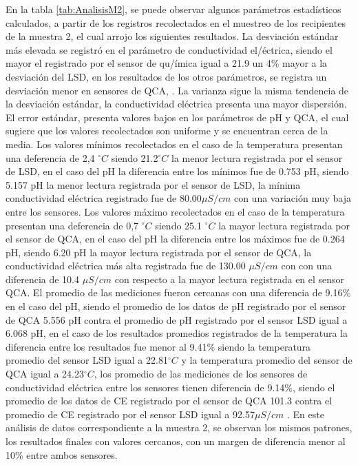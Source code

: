 En la tabla \ref{tab:AnalisisM2}, se puede observar algunos par\'ametros estad\'isticos calculados, a partir de los registros recolectados en el muestreo de los recipientes de la muestra 2, el cual arrojo los siguientes resultados. 
La desviaci\'on est\'andar m\'as elevada se registr\'o en el par\'ametro de conductividad el/éctrica, siendo el mayor el registrado por el sensor de qu/ímica igual a 21.9 un  4\%  mayor a la desviación del LSD, en los resultados de  los otros par\'ametros, se registra un desviaci\'on menor en sensores de QCA,   . 
La varianza sigue la misma tendencia de la desviaci\'on est\'andar, la conductividad el\'ectrica presenta una mayor dispersi\'on. 
El error est\'andar, presenta valores bajos en los par\'ametros de pH y QCA, el cual sugiere que los valores recolectados son uniforme y se encuentran cerca de la media. 
Los valores mínimos recolectados en el caso de la temperatura presentan una deferencia de 2,4 $ ^{\circ}C$ siendo 21.2$ ^{\circ}C$ la menor lectura registrada por el sensor de LSD, en el caso del pH la diferencia entre los mínimos fue de 0.753 pH, siendo 5.157 pH la menor lectura registrada por el sensor de LSD, la m\'inima conductividad el\'ectrica registrado fue de 80.00$\mu S/cm$ con una variaci\'on muy baja entre los sensores. 
Los valores m\'aximo recolectados en el caso de la temperatura presentan una deferencia de 0,7 $ ^{\circ}C$ siendo 25.1 $ ^{\circ}C$ la mayor lectura registrada por el sensor de QCA, en el caso del pH la diferencia entre los m\'aximos fue de 0.264 pH, siendo 6.20 pH la mayor lectura registrada por el sensor de QCA, la conductividad el\'ectrica m\'as alta registrada fue de 130.00 $\mu S/cm$ con con una diferencia de 10.4 $\mu S/cm$ con respecto a la mayor lectura registrada en el sensor QCA.
El promedio de las mediciones fueron cercanas con una diferencia de 9.16$\%$ en el caso del pH, siendo el promedio de los datos de pH registrado por el sensor de QCA 5.556 pH contra el promedio de pH registrado por el sensor LSD igual a 6.068 pH, en el caso de los resultados promedios registrados de la temperatura la diferencia entre los resultados fue menor al 9.41$\%$ siendo la temperatura promedio del sensor LSD igual a 22.81$ ^{\circ}C$ y la temperatura promedio del sensor de QCA igual a 24.23$^{\circ}C$, los promedio de las mediciones de los sensores de conductividad eléctrica entre los sensores tienen diferencia de 9.14$\%$, siendo el promedio de los datos de CE registrado por el sensor de QCA 101.3 contra el promedio de CE registrado por el sensor LSD igual a 92.57$\mu S/cm$ .
En este an\'alisis de datos correspondiente a la muestra 2, se observan los mismos patrones, los resultados finales con valores cercanos, con un margen de diferencia menor al 10\% entre ambos sensores. 


